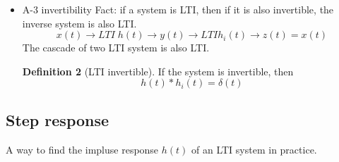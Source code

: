 \documentclass{article}
\theoremstyle{definition}
\newtheorem{definition}{Definition}[subsection]
\begin{document}
\begin{itemize}
\begin{align*}
                   &=\int_{-\infty}^{\infty} |h(\tau)||x(t-\tau)|d\tau \\
                   &\leq M_x \int_{-\infty}^{\infty}|h(\tau)|d\tau
        \end{align*}
        So, sufficient condition:
        \begin{equation}
            \int_{-\infty}^{\infty}|h(\tau)|d\tau < \infty
        \end{equation}
        \begin{definition}[LTI BIBO stable]
            Iff its imppluse response is absolutely integrable, i.e. $ \int_{-\infty}^{\infty} |h(t)|dt <\infty $
        \end{definition}
    \item A-3 invertibility
        Fact: if a system is LTI, then if it is also invertible, the inverse system is also LTI.
        \begin{equation}
            x(t)\rightarrow \boxed{LTI\; h(t)}\rightarrow y(t) \rightarrow \boxed{LTI h_i(t)} \rightarrow z(t) = x(t)
        \end{equation}
        The cascade of two LTI system is also LTI.\\
        \begin{definition}[LTI invertible]
            If the system is invertible, then
            \begin{equation}
                h(t)*h_i(t) = \delta(t)
            \end{equation}
        \end{definition}
\end{itemize}
\subsection{Step response}
A way to find the impluse response $ h(t) $ of an LTI system in practice.
\end{document}

